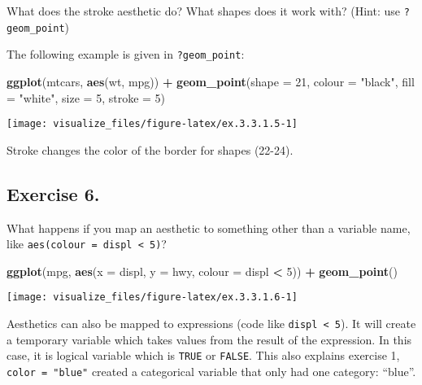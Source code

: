 \documentclass[]{book}
\newenvironment{Shaded}{\begin{snugshade}}{\end{snugshade}}
\newcommand{\DataTypeTok}[1]{\textcolor[rgb]{0.13,0.29,0.53}{#1}}
\newcommand{\DecValTok}[1]{\textcolor[rgb]{0.00,0.00,0.81}{#1}}
\newcommand{\KeywordTok}[1]{\textcolor[rgb]{0.13,0.29,0.53}{\textbf{#1}}}
\newcommand{\NormalTok}[1]{#1}
\newcommand{\OperatorTok}[1]{\textcolor[rgb]{0.81,0.36,0.00}{\textbf{#1}}}
\newcommand{\StringTok}[1]{\textcolor[rgb]{0.31,0.60,0.02}{#1}}
\theoremstyle{definition}
\theoremstyle{definition}
\theoremstyle{definition}
\theoremstyle{remark}
\begin{document}
What does the stroke aesthetic do? What shapes does it work with? (Hint:
use \texttt{?geom\_point})

The following example is given in \texttt{?geom\_point}:

\begin{Shaded}
\begin{Highlighting}[]
\KeywordTok{ggplot}\NormalTok{(mtcars, }\KeywordTok{aes}\NormalTok{(wt, mpg)) }\OperatorTok{+}
\StringTok{  }\KeywordTok{geom_point}\NormalTok{(}\DataTypeTok{shape =} \DecValTok{21}\NormalTok{, }\DataTypeTok{colour =} \StringTok{"black"}\NormalTok{, }\DataTypeTok{fill =} \StringTok{"white"}\NormalTok{, }\DataTypeTok{size =} \DecValTok{5}\NormalTok{, }\DataTypeTok{stroke =} \DecValTok{5}\NormalTok{)}
\end{Highlighting}
\end{Shaded}

\begin{center}\texttt{[image: visualize\_files/figure-latex/ex.3.3.1.5-1]} \end{center}

Stroke changes the color of the border for shapes (22-24).

\hypertarget{exercise-6.}{%
\subsection{Exercise 6.}\label{exercise-6.}}

What happens if you map an aesthetic to something other than a variable
name, like \texttt{aes(colour\ =\ displ\ \textless{}\ 5)}?

\begin{Shaded}
\begin{Highlighting}[]
\KeywordTok{ggplot}\NormalTok{(mpg, }\KeywordTok{aes}\NormalTok{(}\DataTypeTok{x =}\NormalTok{ displ, }\DataTypeTok{y =}\NormalTok{ hwy, }\DataTypeTok{colour =}\NormalTok{ displ }\OperatorTok{<}\StringTok{ }\DecValTok{5}\NormalTok{)) }\OperatorTok{+}\StringTok{ }
\StringTok{  }\KeywordTok{geom_point}\NormalTok{()}
\end{Highlighting}
\end{Shaded}

\begin{center}\texttt{[image: visualize\_files/figure-latex/ex.3.3.1.6-1]} \end{center}

Aesthetics can also be mapped to expressions (code like
\texttt{displ\ \textless{}\ 5}). It will create a temporary variable
which takes values from the result of the expression. In this case, it
is logical variable which is \texttt{TRUE} or \texttt{FALSE}. This also
explains exercise 1, \texttt{color\ =\ "blue"} created a categorical
variable that only had one category: ``blue''.
\end{document}
